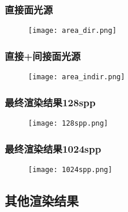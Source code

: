 \documentclass[14pt]{scrartcl} %
\begin{document}
\pagebreak

\subsubsection{直接面光源}

\begin{figure}[h] %
	\centering
	\texttt{[image: area\_dir.png]} %
\end{figure}

\subsubsection{直接+间接面光源}

\begin{figure}[h] %
	\centering
	\texttt{[image: area\_indir.png]} %
\end{figure}

\pagebreak

\subsubsection{最终渲染结果128spp}

\begin{figure}[h] %
	\centering
	\texttt{[image: 128spp.png]} %
\end{figure}

\subsubsection{最终渲染结果1024spp}

\begin{figure}[h] %
	\centering
	\texttt{[image: 1024spp.png]} %
\end{figure}

\pagebreak

\subsection{其他渲染结果}
\end{document}
